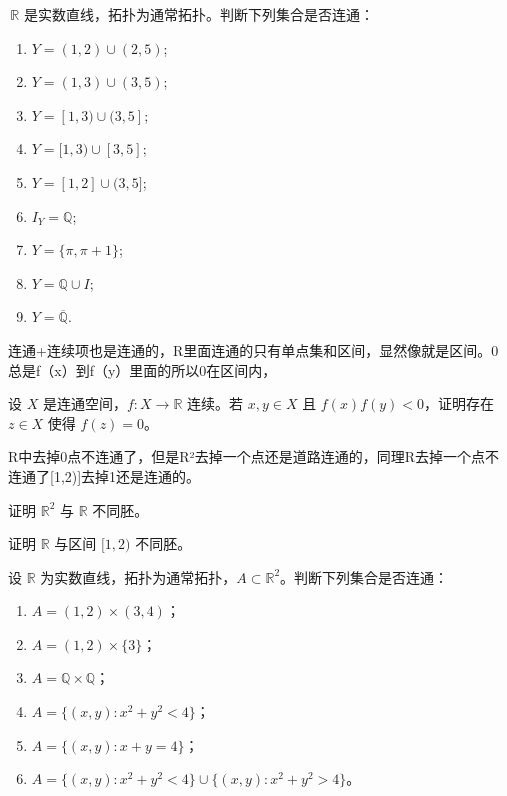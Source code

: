 \begin{homework}[4.5]
$\,\mathbb R$ 是实数直线，拓扑为通常拓扑。判断下列集合是否连通：
\begin{enumerate}
    \item $Y=(1,2)\cup(2,5)$;
    \item $Y=(1,3)\cup(3,5)$;
    \item $Y=[1,3)\cup(3,5]$;
    \item $Y=[1,3)\cup[3,5]$;
    \item $Y=[1,2]\cup(3,5]$;
    \item $I_Y=\mathbb Q$;
    \item $Y=\{\pi,\pi+1\}$;
    \item $Y=\mathbb Q\cup I$;
    \item $Y=\overline{\mathbb Q}$.
\end{enumerate}
\end{homework}
\begin{dxtips}
    连通+连续项也是连通的，R里面连通的只有单点集和区间，显然像就是区间。0总是f（x）到f（y）里面的所以0在区间内，
\end{dxtips}
\begin{homework}[4.6]
设 $X$ 是连通空间，$f:X\to\mathbb R$ 连续。若 $x,y\in X$ 且 $f(x)f(y)<0$，证明存在 $z\in X$ 使得 $f(z)=0$。
\end{homework}
\begin{dxtips}
    R中去掉0点不连通了，但是R²去掉一个点还是道路连通的，同理R去掉一个点不连通了[1,2)]去掉1还是连通的。
\end{dxtips}
\begin{homework}[4.7]
证明 $\mathbb{R}^2$ 与 $\mathbb{R}$ 不同胚。
\end{homework}

\begin{homework}[4.8]
证明 $\mathbb{R}$ 与区间 $[1,2)$ 不同胚。
\end{homework}

\begin{homework}[4.9]
设 $\mathbb{R}$ 为实数直线，拓扑为通常拓扑，$A\subset\mathbb{R}^2$。判断下列集合是否连通：
\begin{enumerate}
  \item $A=(1,2)\times(3,4)$；
  \item $A=(1,2)\times\{3\}$；
  \item $A=\mathbb{Q}\times\mathbb{Q}$；
  \item $A=\{(x,y):x^{2}+y^{2}<4\}$；
  \item $A=\{(x,y):x+y=4\}$；
  \item $A=\{(x,y):x^{2}+y^{2}<4\}\cup\{(x,y):x^{2}+y^{2}>4\}$。
\end{enumerate}
\end{homework}

